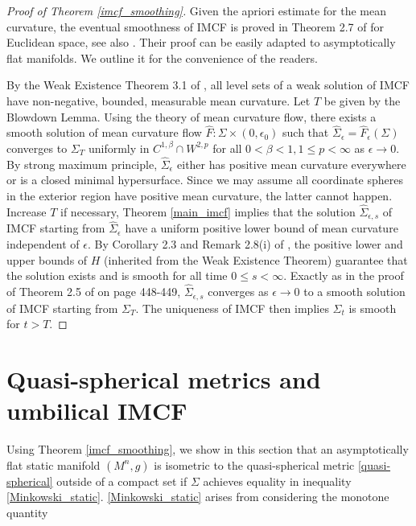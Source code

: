 \documentclass[12pt,twoside]{article}
\theoremstyle{plain}
\theoremstyle{definition}
\theoremstyle{remark}
\newcommand{\rw}{\rightarrow}
\numberwithin{equation}{section}
\begin{document}
\begin{proof}[Proof of Theorem \ref{imcf_smoothing}]
Given the apriori estimate for the mean curvature, the eventual smoothness of IMCF is proved in Theorem 2.7 of \cite{HI2} for Euclidean space, see also \cite[Theorem 1.2]{LW}. Their proof can be easily adapted to asymptotically flat manifolds. We outline it for the convenience of the readers. 

By the Weak Existence Theorem 3.1 of \cite{HI}, all level sets of a weak solution of IMCF have non-negative, bounded, measurable mean curvature. Let $T$ be given by the Blowdown Lemma. Using the theory of mean curvature flow, there exists a smooth solution of mean curvature flow $\hat F: \Sigma \times (0,\epsilon_0 )$ such that $\hat \Sigma_\epsilon = \hat F_\epsilon (\Sigma)$ converges to $\Sigma_T$ uniformly in $C^{1,\beta} \cap W^{2,p}$ for all $0 < \beta < 1, 1 \le p < \infty$ as $\epsilon \rw 0$. By strong maximum principle, $\hat\Sigma_\epsilon$ either has positive mean curvature everywhere or is a closed minimal hypersurface. Since we may assume all coordinate spheres in the exterior region have positive mean curvature, the latter cannot happen. Increase $T$ if necessary, Theorem \ref{main_imcf} implies that the solution $\hat\Sigma_{\epsilon,s}$ of IMCF starting from $\hat\Sigma_\epsilon$ have a uniform positive lower bound of mean curvature independent of $\epsilon$. By Corollary 2.3 and Remark 2.8(i) of \cite{HI2}, the positive lower and upper bounds of $H$ (inherited from the Weak Existence Theorem) guarantee that the solution exists and is smooth for all time $0 \le s< \infty$. Exactly as in the proof of Theorem 2.5 of \cite{HI2} on page 448-449, $\hat\Sigma_{\epsilon,s}$ converges as $\epsilon \rw 0$ to a smooth solution of IMCF starting from $\Sigma_T$. The uniqueness of IMCF then implies $\Sigma_t$ is smooth for $t> T$.
\end{proof}




\section{Quasi-spherical metrics and umbilical IMCF}
Using Theorem \ref{imcf_smoothing}, we show in this section that an asymptotically flat static manifold $(M^{n},g)$ is isometric to the quasi-spherical metric \eqref{quasi-spherical} outside of a compact set if $\Sigma$ achieves equality in inequality \eqref{Minkowski_static}. \eqref{Minkowski_static} arises from considering the monotone quantity
\end{document}
